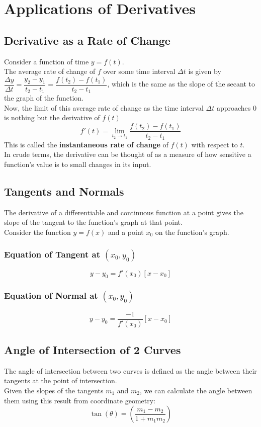 \documentclass[14]{article}
\theoremstyle{definition}
\begin{document}
\section{Applications of Derivatives}
\subsection{Derivative as a Rate of Change}
Consider a function of time $y = f(t)$.\\
The average rate of change of $f$ over some time interval $\Delta t$ is given by $\dfrac{\Delta y}{\Delta t} = \dfrac{y_2 - y_1}{t_2 - t_1} = \dfrac{f(t_2) - f(t_1)}{t_2 - t_1}$, which is the same as the slope of the secant to the graph of the function.\\
Now, the limit of this average rate of change as the time interval $\Delta t$ approaches $0$ is nothing but the derivative of $f(t)$\\
\[
f'(t) = \lim\limits_{t_2 \to t_1} \dfrac{f(t_2) - f(t_1)}{t_2 - t_1}
\]
This is called the \textbf{instantaneous rate of change} of $f(t)$ with respect to $t$.\\
In crude terms, the derivative can be thought of as a measure of how sensitive a function's value is to small changes in its input.
\subsection{Tangents and Normals}
The derivative of a differentiable and continuous function at a point gives the slope of the tangent to the function's graph at that point.\\
Consider the function $y = f(x)$ and a point $x_0$ on the function's graph.
\subsubsection{Equation of Tangent at $(x_0, y_0)$}
\[
y - y_0 = f'(x_0) \left[x - x_0\right]
\]
\subsubsection{Equation of Normal at $(x_0, y_0)$}
\[
y - y_0 = \dfrac{-1}{f'(x_0)} \left[x - x_0\right]
\]
\subsection{Angle of Intersection of 2 Curves}
The angle of intersection between two curves is defined as the angle between their tangents at the point of intersection.\\
Given the slopes of the tangents $m_1$ and $m_2$, we can calculate the angle between them using this result from coordinate geometry:
\[\tan(\theta)= \left(\dfrac{m_1 - m_2}{1 + m_1 m_2}\right)\]
\pagebreak
\end{document}
